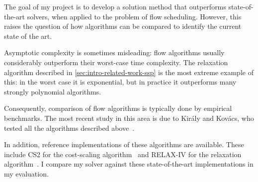 The goal of my project is to develop a solution method that outperforms state-of-the-art solvers, when applied to the problem of flow scheduling. However, this raises the question of how algorithms can be compared to identify the current state of the art.

Asymptotic complexity is sometimes misleading: flow algorithms usually considerably outperform their worst-case time complexity. The relaxation algorithm described in \cref{sec:intro-related-work-ssp} is the most extreme example of this: in the worst case it is exponential, but in practice it outperforms many strongly polynomial algorithms.

Consequently, comparison of flow algorithms is typically done by empirical benchmarks. The most recent study in this area is due to Kir{\'{a}}ly and Kov{\'{a}}cs, who tested all the algorithms described above~\cite{KiralyKovacs:2012,Kovacs:2015}.

In addition, reference implementations of these algorithms are available. These include CS2 for the cost-scaling algorithm~\cite{CS2:2009} and RELAX-IV for the relaxation algorithm~\cite{RelaxIV:2011}. I compare my solver against these state-of-the-art implementations in my evaluation.